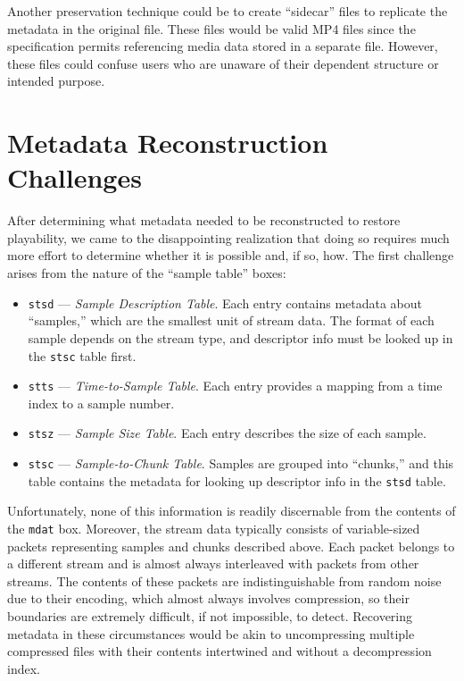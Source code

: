 Another preservation technique could be to create ``sidecar'' files to replicate the metadata in the original file. These files would be valid MP4 files since the specification permits referencing media data stored in a separate file. However, these files could confuse users who are unaware of their dependent structure or intended purpose.

\section{Metadata Reconstruction Challenges}

After determining what metadata needed to be reconstructed to restore playability, we came to the disappointing realization that doing so requires much more effort to determine whether it is possible and, if so, how. The first challenge arises from the nature of the ``sample table'' boxes:

\begin{itemize}
    \item \texttt{stsd} --- \emph{Sample Description Table}. Each entry contains metadata about ``samples,'' which are the smallest unit of stream data. The format of each sample depends on the stream type, and descriptor info must be looked up in the \texttt{stsc} table first.
    \item \texttt{stts} --- \emph{Time-to-Sample Table}. Each entry provides a mapping from a time index to a sample number.
    \item \texttt{stsz} --- \emph{Sample Size Table}. Each entry describes the size of each sample.
    \item \texttt{stsc} --- \emph{Sample-to-Chunk Table}. Samples are grouped into ``chunks,'' and this table contains the metadata for looking up descriptor info in the \texttt{stsd} table.
\end{itemize}

Unfortunately, none of this information is readily discernable from the contents of the \texttt{mdat} box. Moreover, the stream data typically consists of variable-sized packets representing samples and chunks described above. Each packet belongs to a different stream and is almost always interleaved with packets from other streams. The contents of these packets are indistinguishable from random noise due to their encoding, which almost always involves compression, so their boundaries are extremely difficult, if not impossible, to detect. Recovering metadata in these circumstances would be akin to uncompressing multiple compressed files with their contents intertwined and without a decompression index.

